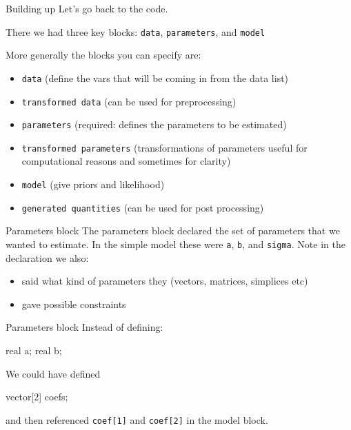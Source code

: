 \documentclass[
  11pt,
  ignorenonframetext,
]{beamer}
\newenvironment{Shaded}{\begin{snugshade}}{\end{snugshade}}
\newcommand{\DecValTok}[1]{\textcolor[rgb]{0.68,0.00,0.00}{#1}}
\newcommand{\NormalTok}[1]{\textcolor[rgb]{0.00,0.23,0.31}{#1}}
\providecommand{\tightlist}{%
  \setlength{\itemsep}{0pt}\setlength{\parskip}{0pt}}\usepackage{longtable,booktabs,array}
\begin{document}
\begin{frame}[fragile]{Building up}
\protect\hypertarget{building-up-1}{}
Let's go back to the code.

There we had three key blocks: \texttt{data}, \texttt{parameters}, and
\texttt{model}

More generally the blocks you can specify are:

\begin{itemize}
\tightlist
\item
  \texttt{data} (define the vars that will be coming in from the data
  list)
\item
  \texttt{transformed\ data} (can be used for preprocessing)
\item
  \texttt{parameters} (required: defines the parameters to be estimated)
\item
  \texttt{transformed\ parameters} (transformations of parameters useful
  for computational reasons and sometimes for clarity)
\item
  \texttt{model} (give priors and likelihood)
\item
  \texttt{generated\ quantities} (can be used for post processing)
\end{itemize}
\end{frame}

\begin{frame}[fragile]{Parameters block}
\protect\hypertarget{parameters-block-3}{}
The parameters block declared the set of parameters that we wanted to
estimate. In the simple model these were \texttt{a}, \texttt{b}, and
\texttt{sigma}. Note in the declaration we also:

\begin{itemize}
\tightlist
\item
  said what kind of parameters they (vectors, matrices, simplices etc)
\item
  gave possible constraints
\end{itemize}
\end{frame}

\begin{frame}[fragile]{Parameters block}
\protect\hypertarget{parameters-block-4}{}
Instead of defining:

\begin{Shaded}
\begin{Highlighting}[]
\NormalTok{real a;}
\NormalTok{real b;}
\end{Highlighting}
\end{Shaded}

We could have defined

\begin{Shaded}
\begin{Highlighting}[]
\NormalTok{vector[}\DecValTok{2}\NormalTok{] coefs;}
\end{Highlighting}
\end{Shaded}

and then referenced \texttt{coef{[}1{]}} and \texttt{coef{[}2{]}} in the
model block.
\end{frame}
\end{document}
